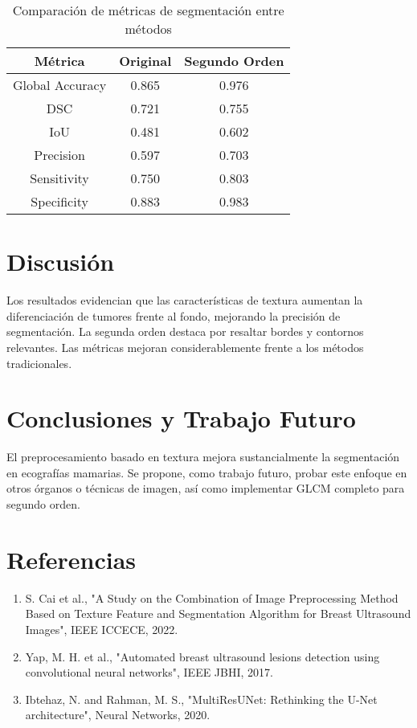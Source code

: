 \documentclass[12pt]{article}
\begin{document}
\begin{table}[H]
\centering
\begin{tabular}{|c|c|c|}
\hline
\textbf{Métrica} & \textbf{Original} & \textbf{Segundo Orden} \\
\hline
Global Accuracy & 0.865 & 0.976 \\
DSC & 0.721 & 0.755 \\
IoU & 0.481 & 0.602 \\
Precision & 0.597 & 0.703 \\
Sensitivity & 0.750 & 0.803 \\
Specificity & 0.883 & 0.983 \\
\hline
\end{tabular}
\caption{Comparación de métricas de segmentación entre métodos}
\end{table}

\section{Discusión}
Los resultados evidencian que las características de textura aumentan la diferenciación de tumores frente al fondo, mejorando la precisión de segmentación. La segunda orden destaca por resaltar bordes y contornos relevantes. Las métricas mejoran considerablemente frente a los métodos tradicionales.

\section{Conclusiones y Trabajo Futuro}
El preprocesamiento basado en textura mejora sustancialmente la segmentación en ecografías mamarias. Se propone, como trabajo futuro, probar este enfoque en otros órganos o técnicas de imagen, así como implementar GLCM completo para segundo orden.

\section*{Referencias}
\begin{enumerate}
    \item S. Cai et al., "A Study on the Combination of Image Preprocessing Method Based on Texture Feature and Segmentation Algorithm for Breast Ultrasound Images", IEEE ICCECE, 2022.
    \item Yap, M. H. et al., "Automated breast ultrasound lesions detection using convolutional neural networks", IEEE JBHI, 2017.
    \item Ibtehaz, N. and Rahman, M. S., "MultiResUNet: Rethinking the U-Net architecture", Neural Networks, 2020.
\end{enumerate}
\end{document}
